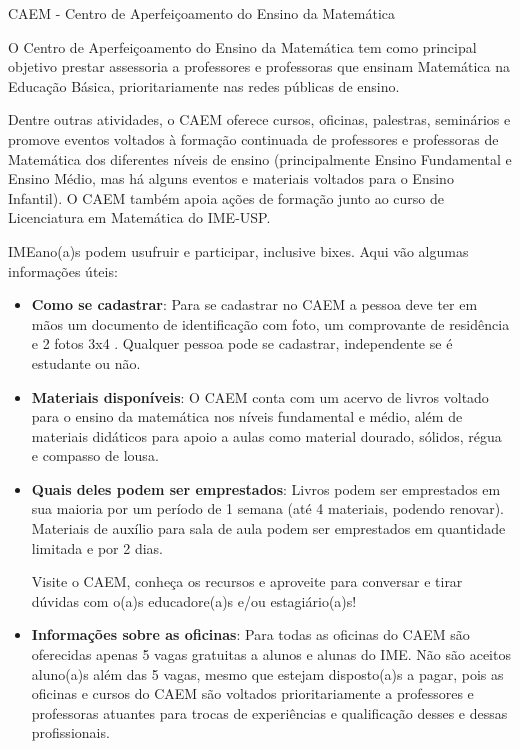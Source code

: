 \begin{secao}{CAEM - Centro de Aperfeiçoamento do Ensino da Matemática}

O Centro de Aperfeiçoamento do Ensino da Matemática tem como principal
objetivo prestar assessoria a professores e professoras que ensinam
Matemática na Educação Básica, prioritariamente nas redes públicas de
ensino.

Dentre outras atividades, o CAEM oferece cursos, oficinas, palestras,
seminários e promove eventos voltados à formação continuada de
professores e professoras de Matemática dos diferentes níveis de ensino
(principalmente Ensino Fundamental e Ensino Médio, mas há alguns eventos
e materiais voltados para o Ensino Infantil). O CAEM também apoia ações
de formação junto ao curso de Licenciatura em Matemática do IME-USP.

IMEano(a)s podem usufruir e participar, inclusive bixes. Aqui vão algumas
informações úteis:

\begin{itemize}

\item \textbf{Como se cadastrar}: Para se cadastrar no CAEM a pessoa
deve ter em mãos um documento de identificação com foto, um comprovante
de residência e 2 fotos 3x4 . Qualquer pessoa pode se cadastrar,
independente se é estudante ou não.

\item \textbf{Materiais disponíveis}: O CAEM conta com um acervo de
livros voltado para o ensino da matemática nos níveis fundamental e
médio, além de materiais didáticos para apoio a aulas como material
dourado, sólidos, régua e compasso de lousa.

\item \textbf{Quais deles podem ser emprestados}: Livros podem ser
emprestados em sua maioria por um período de 1 semana (até 4 materiais,
podendo renovar). Materiais de auxílio para sala de aula podem ser
emprestados em quantidade limitada e por 2 dias.

  Visite o CAEM, conheça os recursos e aproveite para conversar e
  tirar dúvidas com o(a)s educadore(a)s e/ou estagiário(a)s!    

\item \textbf{Informações sobre as oficinas}: Para todas as oficinas
do CAEM são oferecidas apenas 5 vagas gratuitas a alunos e alunas do
IME. Não são aceitos aluno(a)s além das 5 vagas, mesmo que estejam
disposto(a)s a pagar, pois as oficinas e cursos do CAEM são voltados
prioritariamente a professores e professoras atuantes para trocas de
experiências e qualificação desses e dessas profissionais.


\end{itemize}
\end{secao}
